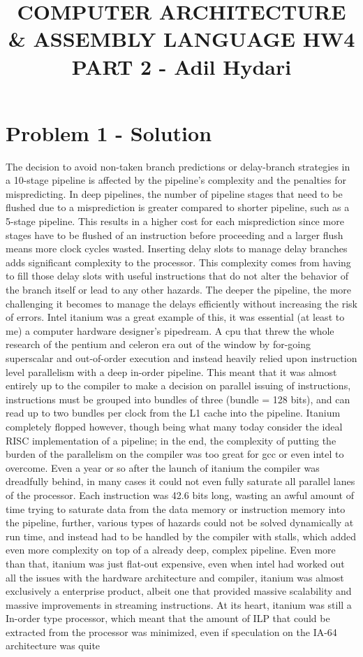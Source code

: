 \documentclass[11pt]{article}
\begin{document}
	\title{\textbf{COMPUTER ARCHITECTURE \& ASSEMBLY LANGUAGE HW4 PART 2 - Adil Hydari}}
	\maketitle
	
\section*{Problem 1 - Solution}
The decision to avoid non-taken branch predictions or delay-branch strategies in a 10-stage pipeline is affected by the pipeline's complexity and the penalties for mispredicting. In deep pipelines, the number of pipeline stages that need to be flushed due to a misprediction is greater compared to shorter pipeline, such as a 5-stage pipeline. This results in a higher cost for each misprediction since more stages have to be flushed of an instruction before proceeding and a larger flush means more clock cycles wasted. Inserting delay slots to manage delay branches adds significant complexity to the processor. This complexity comes from having to fill those delay slots with useful instructions that do not alter the behavior of the branch itself or lead to any other hazards. The deeper the pipeline, the more challenging it becomes to manage the delays efficiently without increasing the risk of errors. Intel itanium was a great example of this, it was essential (at least to me) a computer hardware designer's pipedream. A cpu that threw the whole research of the pentium and celeron era out of the window by for-going superscalar and out-of-order execution and instead heavily relied upon instruction level parallelism with a deep in-order pipeline. This meant that it was almost entirely up to the compiler to make a decision on parallel issuing of instructions, instructions must be grouped into bundles of three (bundle = 128 bits), and can read up to two bundles per clock from the L1 cache into the pipeline. Itanium completely flopped however, though being what many today consider the ideal RISC implementation of a pipeline; in the end, the complexity of putting the burden of the parallelism on the compiler was too great for gcc or even intel to overcome. Even a year or so after the launch of itanium the compiler was dreadfully behind, in many cases it could not even fully saturate all parallel lanes of the processor. Each instruction was 42.6 bits long, wasting an awful amount of time trying to saturate data from the data memory or instruction memory into the pipeline, further, various types of hazards could not be solved dynamically at run time, and instead had to be handled by the compiler with stalls, which added even more complexity on top of a already deep, complex pipeline. Even more than that,  itanium was just flat-out expensive, even when intel had worked out all the issues with the hardware architecture and compiler, itanium was almost exclusively a enterprise product, albeit one that provided massive scalability and massive improvements in streaming instructions. At its heart, itanium was still a In-order type processor, which meant that the amount of ILP that could be extracted from the processor was minimized, even if speculation on the IA-64 architecture was quite 
\end{document}
